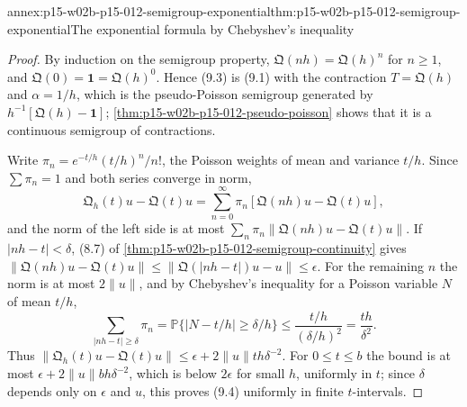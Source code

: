 \begin{annexitem}{annex:p15-w02b-p15-012-semigroup-exponential}{thm:p15-w02b-p15-012-semigroup-exponential}{The exponential formula by Chebyshev's inequality}
\begin{proof}
By induction on the semigroup property, \(\mathfrak Q(nh)=\mathfrak Q(h)^n\) for
\(n\geq1\), and \(\mathfrak Q(0)=\mathbf 1=\mathfrak Q(h)^0\). Hence (9.3) is
(9.1) with the contraction \(T=\mathfrak Q(h)\) and \(\alpha=1/h\), which is
the pseudo-Poisson semigroup generated by \(h^{-1}[\mathfrak Q(h)-\mathbf 1]\);
\cref{thm:p15-w02b-p15-012-pseudo-poisson} shows that it is a continuous
semigroup of contractions.

Write \(\pi_n=e^{-t/h}(t/h)^n/n!\), the Poisson weights of mean and variance
\(t/h\). Since \(\sum\pi_n=1\) and both series converge in norm,
\[
 \mathfrak Q_h(t)u-\mathfrak Q(t)u=\sum_{n=0}^\infty\pi_n[\mathfrak Q(nh)u-\mathfrak Q(t)u],
 \tag{9.5}
\]
and the norm of the left side is at most \(\sum_n\pi_n\|\mathfrak Q(nh)u-\mathfrak Q(t)u\|\).
If \(|nh-t|<\delta\), (8.7) of \cref{thm:p15-w02b-p15-012-semigroup-continuity}
gives \(\|\mathfrak Q(nh)u-\mathfrak Q(t)u\|\leq\|\mathfrak Q(|nh-t|)u-u\|\leq\epsilon\).
For the remaining \(n\) the norm is at most \(2\|u\|\), and by Chebyshev's
inequality for a Poisson variable \(N\) of mean \(t/h\),
\[
 \sum_{|nh-t|\geq\delta}\pi_n=\mathbb P\{|N-t/h|\geq\delta/h\}
   \leq\frac{t/h}{(\delta/h)^2}=\frac{th}{\delta^2}.
\]
Thus \(\|\mathfrak Q_h(t)u-\mathfrak Q(t)u\|\leq\epsilon+2\|u\|th\delta^{-2}\).
For \(0\leq t\leq b\) the bound is at most \(\epsilon+2\|u\|bh\delta^{-2}\),
which is below \(2\epsilon\) for small \(h\), uniformly in \(t\); since
\(\delta\) depends only on \(\epsilon\) and \(u\), this proves (9.4)
uniformly in finite \(t\)-intervals.
\end{proof}
\end{annexitem}

